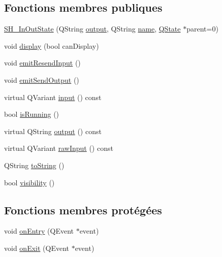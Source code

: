 \subsection*{Fonctions membres publiques}
\begin{DoxyCompactItemize}
\item 
\hyperlink{classSH__InOutState_a5fa88487103a8e197a8453c991bb056b}{S\-H\-\_\-\-In\-Out\-State} (Q\-String \hyperlink{classSH__InOutState_a17ed7eaf5e3ed5af80a4f9fe65d5bfd9}{output}, Q\-String \hyperlink{classSH__NamedObject_a9f686c6f2a5bcc08ad03d0cee0151f0f}{name}, \hyperlink{classQState}{Q\-State} $\ast$parent=0)
\item 
void \hyperlink{classSH__InOutState_a616f88b20478b81b2927a9ddc2b4f521}{display} (bool can\-Display)
\item 
void \hyperlink{classSH__InOutState_ad1695493d39c5194e5b7c6372754ddd7}{emit\-Resend\-Input} ()
\item 
void \hyperlink{classSH__InOutState_a40995f4a8201f21d26b7e78b7e7b652e}{emit\-Send\-Output} ()
\item 
virtual Q\-Variant \hyperlink{classSH__InOutState_a8e1b78069343122df7713624a1a5a100}{input} () const 
\item 
bool \hyperlink{classSH__GenericState_a5f731810dad0cacd28828ccbf1539e4e}{is\-Running} ()
\item 
virtual Q\-String \hyperlink{classSH__InOutState_a17ed7eaf5e3ed5af80a4f9fe65d5bfd9}{output} () const 
\item 
virtual Q\-Variant \hyperlink{classSH__InOutState_a4c674a54f41d2e6ef951b22393dcd89f}{raw\-Input} () const 
\item 
Q\-String \hyperlink{classSH__GenericState_a7779babbb40f3f8faa71112204d9804f}{to\-String} ()
\item 
bool \hyperlink{classSH__InOutState_a3a18752c4122c26a2ebf38310c9c1b75}{visibility} ()
\end{DoxyCompactItemize}
\subsection*{Fonctions membres protégées}
\begin{DoxyCompactItemize}
\item 
void \hyperlink{classSH__GenericState_a68c67ef95738e01cd34cd5926f4932fb}{on\-Entry} (Q\-Event $\ast$event)
\item 
void \hyperlink{classSH__GenericState_a7f7863859318c70c9b734be5bf5510b0}{on\-Exit} (Q\-Event $\ast$event)
\end{DoxyCompactItemize}
